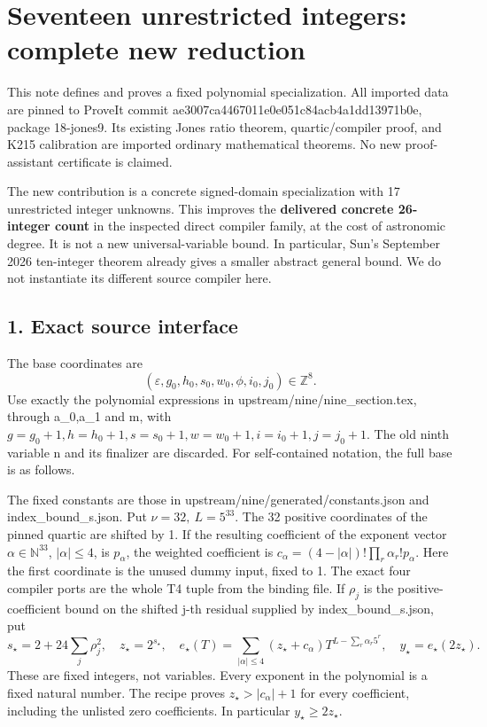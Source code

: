 \hypertarget{seventeen-unrestricted-integers-complete-new-reduction}{%
\section{Seventeen unrestricted integers: complete new
reduction}\label{seventeen-unrestricted-integers-complete-new-reduction}}

This note defines and proves a fixed polynomial specialization. All
imported data are pinned to ProveIt commit
ae3007ca4467011e0e051c84acb4a1dd13971b0e, package 18-jones9. Its
existing Jones ratio theorem, quartic/compiler proof, and K215
calibration are imported ordinary mathematical theorems. No new
proof-assistant certificate is claimed.

The new contribution is a concrete signed-domain specialization with 17
unrestricted integer unknowns. This improves the \textbf{delivered
concrete 26-integer count} in the inspected direct compiler family, at
the cost of astronomic degree. It is not a new universal-variable bound.
In particular, Sun's September 2026 ten-integer theorem already gives a
smaller abstract general bound. We do not instantiate its different
source compiler here.

\hypertarget{exact-source-interface}{%
\subsection{1. Exact source interface}\label{exact-source-interface}}

The base coordinates are \[
 (\varepsilon,g_0,h_0,s_0,w_0,\phi,i_0,j_0)\in\mathbb Z^8.
\] Use exactly the polynomial expressions in
upstream/nine/nine\_section.tex, through a\_0,a\_1 and m, with
\(g=g_0+1,h=h_0+1,s=s_0+1,w=w_0+1,i=i_0+1,j=j_0+1\). The old ninth
variable n and its finalizer are discarded. For self-contained notation,
the full base is as follows.

The fixed constants are those in upstream/nine/generated/constants.json
and index\_bound\_s.json. Put \(\nu=32,\ L=5^{33}\). The 32 positive
coordinates of the pinned quartic are shifted by 1. If the resulting
coefficient of the exponent vector \(\alpha\in \mathbb N^{33}\),
\(|\alpha|\le4\), is \(p_\alpha\), the weighted coefficient is
\(c_\alpha=(4-|\alpha|)!\prod_r\alpha_r!p_\alpha\). Here the first
coordinate is the unused dummy input, fixed to 1. The exact four
compiler ports are the whole T4 tuple from the binding file. If
\(\rho_j\) is the positive-coefficient bound on the shifted j-th
residual supplied by index\_bound\_s.json, put \[
 s_\star=2+24\sum_j\rho_j^2,\quad z_\star=2^{s_\star},\quad
 e_\star(T)=\sum_{|\alpha|\le4}(z_\star+c_\alpha)
 T^{L-\sum_r\alpha_r5^r},\quad y_\star=e_\star(2z_\star).
\] These are fixed integers, not variables. Every exponent in the
polynomial is a fixed natural number. The recipe proves
\(z_\star>|c_\alpha|+1\) for every coefficient, including the unlisted
zero coefficients. In particular \(y_\star\ge 2z_\star\).

